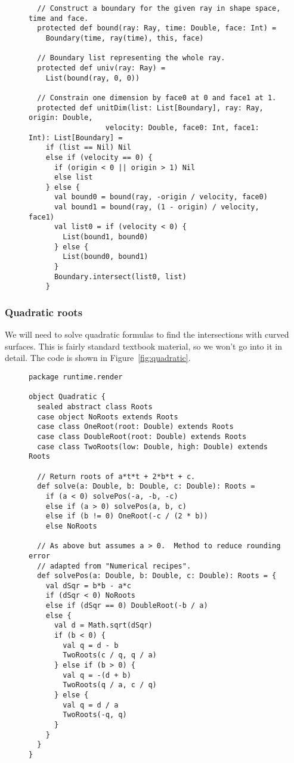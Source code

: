 \begin{figure}
\begin{verbatim}
  // Construct a boundary for the given ray in shape space, time and face.
  protected def bound(ray: Ray, time: Double, face: Int) =
    Boundary(time, ray(time), this, face)

  // Boundary list representing the whole ray.
  protected def univ(ray: Ray) =
    List(bound(ray, 0, 0))

  // Constrain one dimension by face0 at 0 and face1 at 1.
  protected def unitDim(list: List[Boundary], ray: Ray, origin: Double,
                  velocity: Double, face0: Int, face1: Int): List[Boundary] =
    if (list == Nil) Nil
    else if (velocity == 0) {
      if (origin < 0 || origin > 1) Nil
      else list
    } else {
      val bound0 = bound(ray, -origin / velocity, face0)
      val bound1 = bound(ray, (1 - origin) / velocity, face1)
      val list0 = if (velocity < 0) {
        List(bound1, bound0)
      } else {
        List(bound0, bound1)
      }
      Boundary.intersect(list0, list)
    }
\end{verbatim}
\getcaption
\end{figure}


\subsubsection{Quadratic roots\label{sec:quadratic}}

We will need to solve quadratic formulas
to find the intersections with curved surfaces.
This is fairly standard textbook material,
so we won't go into it in detail.
The code is shown in Figure~\ref{fig:quadratic}.

\begin{figure}
\begin{verbatim}
package runtime.render

object Quadratic {
  sealed abstract class Roots
  case object NoRoots extends Roots
  case class OneRoot(root: Double) extends Roots
  case class DoubleRoot(root: Double) extends Roots
  case class TwoRoots(low: Double, high: Double) extends Roots

  // Return roots of a*t*t + 2*b*t + c.
  def solve(a: Double, b: Double, c: Double): Roots =
    if (a < 0) solvePos(-a, -b, -c)
    else if (a > 0) solvePos(a, b, c)
    else if (b != 0) OneRoot(-c / (2 * b))
    else NoRoots

  // As above but assumes a > 0.  Method to reduce rounding error
  // adapted from "Numerical recipes".
  def solvePos(a: Double, b: Double, c: Double): Roots = {
    val dSqr = b*b - a*c
    if (dSqr < 0) NoRoots
    else if (dSqr == 0) DoubleRoot(-b / a)
    else {
      val d = Math.sqrt(dSqr)
      if (b < 0) {
        val q = d - b
        TwoRoots(c / q, q / a)
      } else if (b > 0) {
        val q = -(d + b)
        TwoRoots(q / a, c / q)
      } else {
        val q = d / a
        TwoRoots(-q, q)
      }
    }
  }
}
\end{verbatim}
\getcaption
\end{figure}

